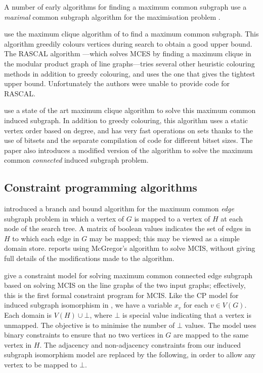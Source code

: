 A number of early algorithms for finding a maximum common subgraph use a \emph{maximal}
common subgraph algorithm \citep{DBLP:journals/cacm/BronK73} for the maximisation problem
\citep{durand1999efficient,DBLP:conf/mco/VismaraV08}.

\citet{DBLP:conf/sspr/BunkeFGSV02} use the maximum clique algorithm of
\citet{DBLP:journals/siamcomp/BalasY86} to find a maximum common subgraph.
This algorithm greedily colours vertices during search to obtain a good upper
bound.  The RASCAL algorithm \citep{raymond2002rascal}---which solves MCES by
finding a maximum clique in the modular product graph of line graphs---tries
several other heuristic colouring methods in addition to greedy colouring, and
uses the one that gives the tightest upper bound.  Unfortunately the authors
were unable to provide code for RASCAL.

\cite{DBLP:conf/cp/McCreeshNPS16} use a state of the art maximum clique
algorithm to solve this maximum common induced subgraph.  In addition to greedy
colouring, this algorithm uses a static vertex order based on degree, and has
very fast operations on sets thanks to the use of bitsets and the separate
compilation of code for different bitset sizes.  The paper also introduces a
modified version of the algorithm to solve the maximum common \emph{connected}
induced subgraph problem.

\subsection{Constraint programming algorithms}

\citet{DBLP:journals/spe/McGregor82}
introduced a branch and bound algorithm for the maximum common
\emph{edge} subgraph problem in which a vertex of $G$ is mapped to a vertex
of $H$ at each node of the search tree.  A matrix of boolean values indicates
the set of edges in $H$ to which each edge in $G$ may be mapped; this may be
viewed as a simple domain store. \citet{DBLP:conf/sspr/BunkeFGSV02}
reports using McGregor's algorithm to solve MCIS, without giving full
details of the modifications made to the algorithm.

\citet{DBLP:conf/mco/VismaraV08} give a constraint model for solving maximum
common connected edge subgraph based on solving MCIS on the line graphs of the
two input graphs; effectively, this is the first formal constraint program for
MCIS.  Like the CP model for induced subgraph isomorphism in
, we have a variable $x_v$ for each $v \in V(G)$.
Each domain is $V(H) \cup \bot$, where $\bot$ is special value indicating that
a vertex is unmapped.  The objective is to minimise the number of $\bot$
values.  The model uses binary constraints to ensure that no two vertices in
$G$ are mapped to the same vertex in $H$.  The adjacency and non-adjacency
constraints from our induced subgraph isomorphism model are replaced by the
following, in order to allow any vertex to be mapped to $\bot$.


